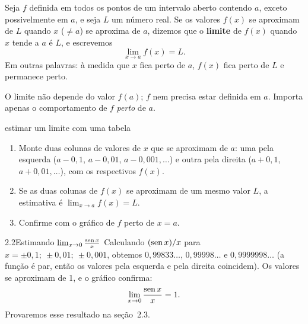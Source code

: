 \begin{definicao}
Seja $f$ definida em todos os pontos de um intervalo aberto contendo $a$, exceto
possivelmente em $a$, e seja $L$ um número real. Se os valores $f(x)$ se aproximam de $L$
quando $x$ ($\neq a$) se aproxima de $a$, dizemos que o \textbf{limite} de $f(x)$ quando
$x$ tende a $a$ é $L$, e escrevemos
\[
\lim_{x\to a}f(x)=L .
\]
Em outras palavras: à medida que $x$ fica perto de $a$, $f(x)$ fica perto de $L$ e
permanece perto.
\end{definicao}

\begin{nota}
O limite não depende do valor $f(a)$; $f$ nem precisa estar definida em $a$. Importa
apenas o comportamento de $f$ \emph{perto} de $a$.
\end{nota}

\begin{estrategia}{estimar um limite com uma tabela}
\begin{enumerate}[label=\arabic*.]
\item Monte duas colunas de valores de $x$ que se aproximam de $a$: uma pela esquerda
  ($a-0{,}1$, $a-0{,}01$, $a-0{,}001,\dots$) e outra pela direita ($a+0{,}1$,
  $a+0{,}01,\dots$), com os respectivos $f(x)$.
\item Se as duas colunas de $f(x)$ se aproximam de um mesmo valor $L$, a estimativa é
  $\lim_{x\to a}f(x)=L$.
\item Confirme com o gráfico de $f$ perto de $x=a$.
\end{enumerate}
\end{estrategia}

\begin{exemplo}{2.2}{Estimando $\lim_{x\to0}\frac{\operatorname{sen} x}{x}$}
Calculando $(\operatorname{sen} x)/x$ para $x=\pm0{,}1;\ \pm0{,}01;\ \pm0{,}001$, obtemos
$0{,}99833\ldots$, $0{,}99998\ldots$ e $0{,}9999998\ldots$ (a função é par, então os valores
pela esquerda e pela direita coincidem). Os valores se aproximam de 1, e o gráfico confirma:
\[
\lim_{x\to0}\frac{\operatorname{sen} x}{x}=1 .
\]
Provaremos esse resultado na seção~2.3.
\end{exemplo}

